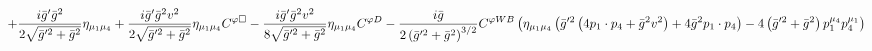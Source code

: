 %
\begin{dmath*}
%
  +  \frac{i {\bar g}^\prime {\bar g}{}^2}{2 \sqrt{{\bar g}^{\prime 2} + {\bar g}{}^2}}\eta_{\mu_1 \mu_4}  +  \frac{i {\bar g}^\prime {\bar g}{}^2 v^2}{2 \sqrt{{\bar g}^{\prime 2} + {\bar g}{}^2}}\eta_{\mu_1 \mu_4} C^{ \varphi  \Box}  -  \frac{i {\bar g}^\prime {\bar g}{}^2 v^2}{8 \sqrt{{\bar g}^{\prime 2} + {\bar g}{}^2}}\eta_{\mu_1 \mu_4} C^{ \varphi  D}  -  \frac{i {\bar g}{}}{2 \left({\bar g}^{\prime 2} + {\bar g}{}^2\right)^{3/2}}C^{ \varphi  WB} \left(\eta_{\mu_1 \mu_4} \left({\bar g}^{\prime 2} \left(4 p_{1}\nobreak\cdot\nobreak{}p_{4} + {\bar g}{}^2 v^2\right) + 4 {\bar g}{}^2 p_{1}\nobreak\cdot\nobreak{}p_{4}\right) - 4 \left({\bar g}^{\prime 2} + {\bar g}{}^2\right) p_1^{\mu_4} p_4^{\mu_1}\right)
%
\end{dmath*}
%
